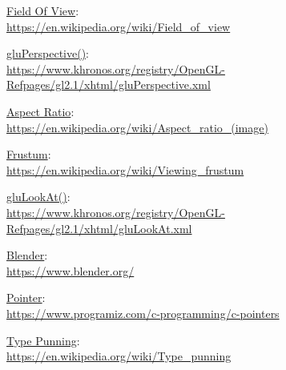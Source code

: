 \documentclass[12pt]{article}
\begin{document}
\pagebreak




\begin{thebibliography}{9}

\underline{Field Of View}:\\
\url{https://en.wikipedia.org/wiki/Field_of_view}

\underline{gluPerspective()}:\\
\url{https://www.khronos.org/registry/OpenGL-Refpages/gl2.1/xhtml/gluPerspective.xml}

\underline{Aspect Ratio}:\\
\url{https://en.wikipedia.org/wiki/Aspect_ratio_(image)}

\underline{Frustum}:\\
\url{https://en.wikipedia.org/wiki/Viewing_frustum}

\underline{gluLookAt()}:\\
\url{https://www.khronos.org/registry/OpenGL-Refpages/gl2.1/xhtml/gluLookAt.xml}

\underline{Blender}:\\
\url{https://www.blender.org/}

\underline{Pointer}:\\
\url{https://www.programiz.com/c-programming/c-pointers}

\underline{Type Punning}:\\
\url{https://en.wikipedia.org/wiki/Type_punning}







\end{thebibliography}
\end{document}
